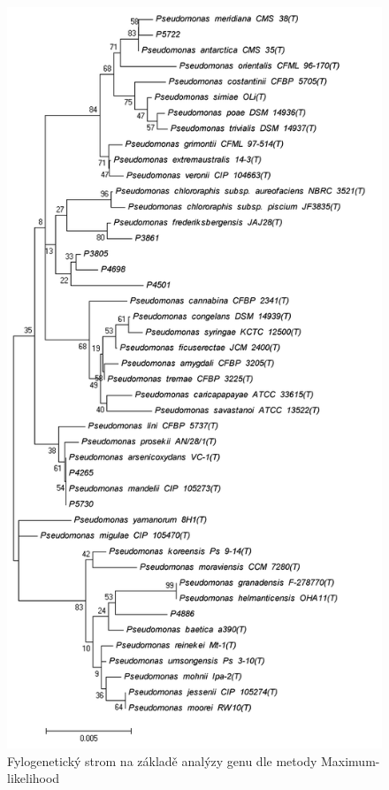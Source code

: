 %
\begin{figure}[h!!!]
  \centering
  \includegraphics[scale=0.50]{text/Pictures/160508_16S_ML_clustalW_Bootstrap-consensus.png}
	\caption{Fylogenetický strom na základě analýzy genu  dle metody Maximum-likelihood}
	\label{rrs_ML}
\end{figure}
\pagebreak

